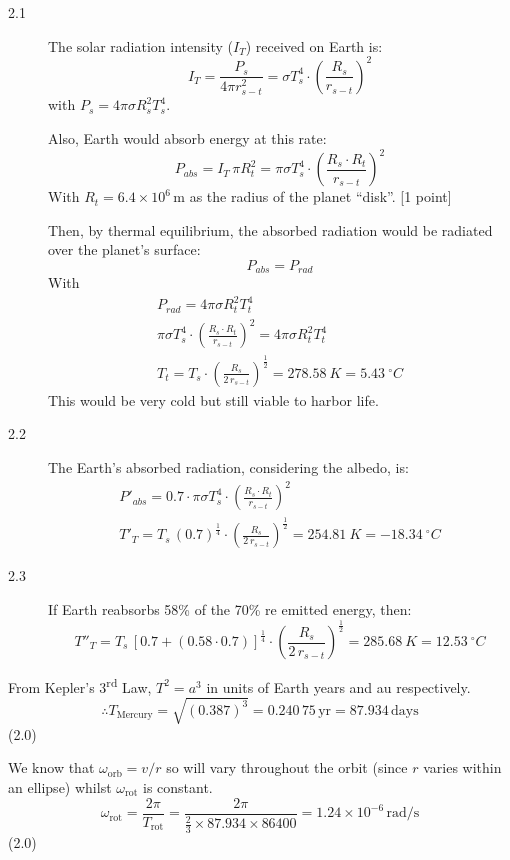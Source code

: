 \begin{description}
\item[2.1] The solar radiation intensity ($I_T$) received on Earth is:
  \[
  I_T = \frac{P_s}{4\pi r_{s-t}^2} = \sigma T_s^4\cdot\left(\frac{R_s}{r_{s-t}}\right)^{2} \tag*{[1 point]}
  \]
  with $P_s = 4\pi\sigma R_s^2 T_s^4$.

  Also, Earth would absorb energy at this rate:
  \[
  P_{abs} = I_T\,\pi R_t^2 = \pi\sigma T_s^4\cdot\left(\frac{R_s\cdot R_t}{r_{s-t}}\right)^{2}
  \]
  With $R_t = 6.4\times10^{6}$\,m as the radius of the planet ``disk''.
  \hfill[1 point]

  Then, by thermal equilibrium, the absorbed radiation would be radiated over
  the planet's surface:
  \[
  P_{abs} = P_{rad}
  \]
  With
  \begin{gather*}
  P_{rad} = 4\pi\sigma R_t^2 T_t^4\\
  \pi\sigma T_s^4\cdot\left(\frac{R_s\cdot R_t}{r_{s-t}}\right)^{2}
    = 4\pi\sigma R_t^2 T_t^4 \tag*{[1 point]}\\
  T_t = T_s\cdot\left(\frac{R_s}{2\,r_{s-t}}\right)^{\frac{1}{2}}
    = 278.58~K = 5.43~^\circ C \tag*{[1 point]}
  \end{gather*}
  This would be very cold but still viable to harbor life.
\item[2.2] The Earth's absorbed radiation, considering the albedo, is:
  \begin{gather*}
  P'_{abs} = 0.7\cdot\pi\sigma T_s^4\cdot\left(\frac{R_s\cdot R_t}{r_{s-t}}\right)^{2} \tag*{[1 point]}\\
  T'_T = T_s\,(0.7)^{\frac{1}{4}}\cdot\left(\frac{R_s}{2\,r_{s-t}}\right)^{\frac{1}{2}}
    = 254.81~K = -18.34~^\circ C \tag*{[1 point]}
  \end{gather*}
\item[2.3] If Earth reabsorbs 58\% of the 70\% re emitted energy, then:
  \[
  T''_T = T_s\,[0.7 + (0.58\cdot0.7)]^{\frac{1}{4}}
    \cdot\left(\frac{R_s}{2\,r_{s-t}}\right)^{\frac{1}{2}}
    = 285.68~K = 12.53~^\circ C \tag*{[4 points]}
  \]
\end{description}

From Kepler's 3\textsuperscript{rd} Law, $T^2 = a^3$ in units of Earth years and au respectively.
\[
\therefore T_{\mathrm{Mercury}} = \sqrt{(0.387)^3} = 0.240\,75\,\mathrm{yr} = 87.934\,\mathrm{days}
\]
\hfill(2.0)

We know that $\omega_{\mathrm{orb}} = v/r$ so will vary throughout the orbit (since $r$ varies within
an ellipse) whilst $\omega_{\mathrm{rot}}$ is constant.
\[
\omega_{\mathrm{rot}} = \frac{2\pi}{T_{\mathrm{rot}}}
= \frac{2\pi}{\frac{2}{3} \times 87.934 \times 86400}
= 1.24 \times 10^{-6}\,\mathrm{rad/s}
\]
\hfill(2.0)

